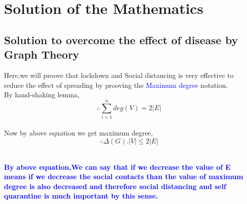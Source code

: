 \documentclass[12pt]{article}
\begin{document}
\section{\bf {Solution  of the Mathematics}}




\subsection{ Solution to overcome the effect of disease by Graph Theory} 

\par {Here,we will  proove that  lockdown and Social distancing is very effective to reduce the effect of spreading by prooving the \textcolor{blue}{Maximum degree} notation.}\\
[1 cm]
By hand-shaking lemma,\\
$$\therefore \boxed{\sum_{i=1}^{n} deg(V) = 2|E|}$$
\\
[1 mm]
Now by above equation we get maximum degree,\\
\begin{equation}
\therefore\boxed {\Delta(G).|V| \leq2|E|}
\end{equation}
\\
[1 cm]
\begin{tcolorbox}[enhanced,fit to height=4cm,
  colback=yellow!25!black!10!yellow,colframe=green!75!white,title=\textcolor{red}{Conclusion:1},
  drop fuzzy shadow]
  \textcolor{blue}{\bf{By above equation,We can say that if we decrease the value of E means if we decrease the social contacts than the value of maximum degree is also decreased and therefore social distancing and self quarantine is much important by this sense.}} 
\end{tcolorbox}
\newpage
\end{document}

